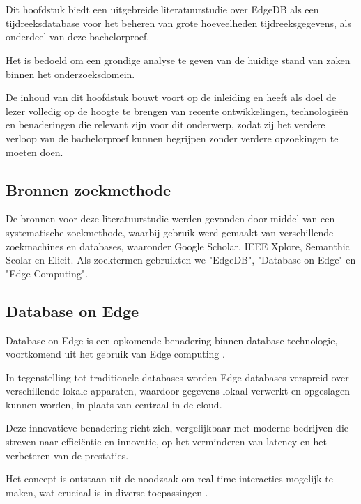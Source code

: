 \chapter{}%
\label{ch:stand-van-zaken}

Dit hoofdstuk biedt een uitgebreide literatuurstudie over EdgeDB als een tijdreeksdatabase voor het beheren van grote hoeveelheden tijdreeksgegevens, als onderdeel van deze bachelorproef.

Het is bedoeld om een grondige analyse te geven van de huidige stand van zaken binnen het onderzoeksdomein.

De inhoud van dit hoofdstuk bouwt voort op de inleiding en heeft als doel de lezer volledig op de hoogte te brengen van recente ontwikkelingen, technologieën en benaderingen die relevant zijn voor dit onderwerp, zodat zij het verdere verloop van de bachelorproef kunnen begrijpen zonder verdere opzoekingen te moeten doen.

\section{Bronnen zoekmethode}
De bronnen voor deze literatuurstudie werden gevonden door middel van een systematische zoekmethode, waarbij gebruik werd gemaakt van verschillende zoekmachines en databases, waaronder Google Scholar, IEEE Xplore, Semanthic Scolar en Elicit.
Als zoektermen gebruikten we "EdgeDB", "Database on Edge" en "Edge Computing".

\section{Database on Edge}

Database on Edge is een opkomende benadering binnen database technologie, voortkomend uit het gebruik van Edge computing \autocite{Yang2019EdgeDBAE}.

In tegenstelling tot traditionele databases worden Edge databases verspreid over verschillende lokale apparaten, waardoor gegevens lokaal verwerkt en opgeslagen kunnen worden, in plaats van centraal in de cloud.

Deze innovatieve benadering richt zich, vergelijkbaar met moderne bedrijven die streven naar efficiëntie en innovatie, op het verminderen van latency en het verbeteren van de prestaties.

Het concept is ontstaan uit de noodzaak om real-time interacties mogelijk te maken, wat cruciaal is in diverse toepassingen \autocite{Yang2019EdgeDBAE}.

